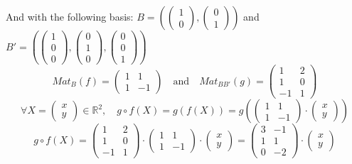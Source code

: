 \documentclass[notitlepage]{math}
\begin{document}
And with the following basis:
$B = (\begin{pmatrix} 1 \\ 0 \end{pmatrix}, \begin{pmatrix} 0 \\ 1 \end{pmatrix})$ and $B' = (\begin{pmatrix} 1 \\ 0 \\ 0 \end{pmatrix}, \begin{pmatrix} 0 \\ 1 \\ 0 \end{pmatrix}, \begin{pmatrix} 0 \\ 0 \\ 1 \end{pmatrix})$ \\
\[ Mat_B(f)= \begin{pmatrix}
        1 & 1 \\
        1 & -1
    \end{pmatrix} \quad \text{and} \quad Mat_{BB'}(g)=\begin{pmatrix}
        1 & 2  \\
        1 & 0  \\
        -1 & 1
    \end{pmatrix}\]
    \[ \forall X = \begin{pmatrix} x \\ y \end{pmatrix} \in \mathbb{R}^2, \quad g \circ f(X) = g(f(X)) = g \left(\begin{pmatrix}
        1 & 1 \\
        1 & -1
    \end{pmatrix} \cdot \begin{pmatrix}
        x \\
        y
    \end{pmatrix} \right)\]
    \[ g \circ f(X) =
        \begin{pmatrix}
        1 & 2  \\
        1 & 0  \\
        -1 & 1
    \end{pmatrix} \cdot \begin{pmatrix}
        1 & 1 \\
        1 & -1
    \end{pmatrix} \cdot \begin{pmatrix}
        x \\
        y
    \end{pmatrix} = \begin{pmatrix}
        3 & -1 \\
        1 & 1 \\
        0 & -2 
    \end{pmatrix} \cdot \begin{pmatrix}
        x \\
        y
    \end{pmatrix} \]
\end{document}
